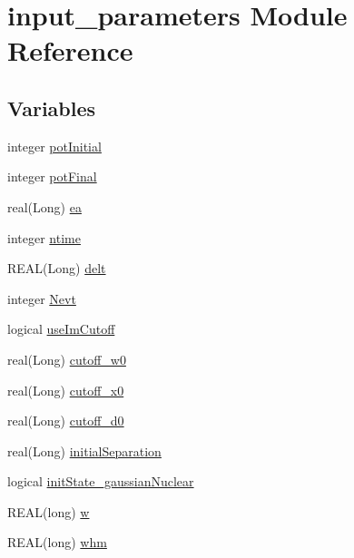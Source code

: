 \hypertarget{namespaceinput__parameters}{
\section{input\_\-parameters Module Reference}
\label{namespaceinput__parameters}
}
\subsection*{Variables}
\begin{DoxyCompactItemize}
\item 
integer \hyperlink{namespaceinput__parameters_a27dbda031851f558814121445cf46ed9}{potInitial}
\item 
integer \hyperlink{namespaceinput__parameters_a2ccc9d711d290b3e33fbc675ed390af2}{potFinal}
\item 
real(Long) \hyperlink{namespaceinput__parameters_ac937498371c0568d2d4ed1e1ef034e1d}{ea}
\item 
integer \hyperlink{namespaceinput__parameters_a0c5bab2cbe910c8543c442cb9be582d0}{ntime}
\item 
REAL(Long) \hyperlink{namespaceinput__parameters_a42efff37bd453975f48e8485e5757acd}{delt}
\item 
integer \hyperlink{namespaceinput__parameters_a3db2ebb8fcd24f403d0c3bd05a38e4c2}{Nevt}
\item 
logical \hyperlink{namespaceinput__parameters_aa73f50863135132e72d9a9c93d2cadef}{useImCutoff}
\item 
real(Long) \hyperlink{namespaceinput__parameters_a3987174aef89a10227220b4e5bdecde6}{cutoff\_\-w0}
\item 
real(Long) \hyperlink{namespaceinput__parameters_a87f2d307b48a20f985ea0692b9dfebf6}{cutoff\_\-x0}
\item 
real(Long) \hyperlink{namespaceinput__parameters_a8e63bceb853ebd1124eda12568a0e57f}{cutoff\_\-d0}
\item 
real(Long) \hyperlink{namespaceinput__parameters_a1d8bbaa8b473b798cb43170831cc57ac}{initialSeparation}
\item 
logical \hyperlink{namespaceinput__parameters_add8bfc502078fcdca67fff41e00114f7}{initState\_\-gaussianNuclear}
\item 
REAL(long) \hyperlink{namespaceinput__parameters_a745c6398e72faacdaacba0cf01027565}{w}
\item 
REAL(long) \hyperlink{namespaceinput__parameters_ae3a25357531dd0d2b8c5c4cc2de073d9}{whm}
\item 

\end{DoxyCompactItemize}
